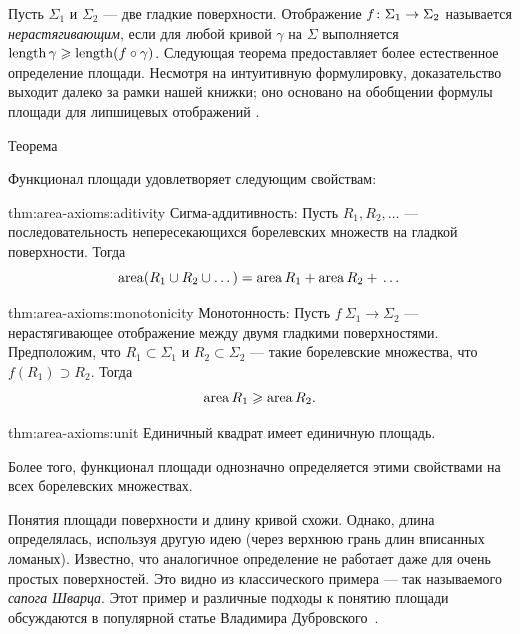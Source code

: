 Пусть $\Sigma_1$ и $\Sigma_2$ --- две гладкие поверхности.
Отображение $f\:\Sigma_1\z\to \Sigma_2$ называется \emph{нерастягивающим}, если для любой кривой $\gamma$ на $\Sigma$ выполняется $\mathop{\rm length}\nolimits\gamma\geqslant \mathop{\rm length}\nolimits (f\circ\gamma)$. 
Следующая теорема предоставляет более естественное определение площади.
Несмотря на интуитивную формулировку, доказательство выходит далеко за рамки нашей книжки;
оно основано на обобщении формулы площади для липшицевых отображений \cite[3.2.3]{federer}.


\begin{thm}{Теорема}\label{thm:area-axioms}
{\sloppy
Функционал площади удовлетворяет следующим свойствам:

}

\begin{subthm}{thm:area-axioms:aditivity}
Сигма-аддитивность: 
Пусть $R_1,R_2,\dots$ --- последовательность непересекающихся борелевских множеств на гладкой поверхности.
Тогда 
\[\mathop{\rm area}\nolimits (R_1\cup R_2\cup \dots)=\mathop{\rm area}\nolimits R_1+\mathop{\rm area}\nolimits R_2+{}\dots\]
\end{subthm}

{\sloppy

\begin{subthm}{thm:area-axioms:monotonicity}
Монотонность:
Пусть $f\:\Sigma_1\to \Sigma_2$ --- нерастягивающее отображение между двумя гладкими поверхностями.
Предположим, что $R_1\subset \Sigma_1$ и $R_2\subset \Sigma_2$ --- такие борелевские множества, что $f(R_1)\supset R_2$.
Тогда 
\[\mathop{\rm area}\nolimits R_1\geqslant \mathop{\rm area}\nolimits R_2.\]
\end{subthm}

}

\begin{subthm}{thm:area-axioms:unit}
Единичный квадрат имеет единичную площадь. 
\end{subthm}

Более того, функционал площади однозначно определяется этими свойствами на всех борелевских множествах.
\end{thm}

Понятия площади поверхности и длину кривой схожи.
Однако, длина определялась, используя другую идею (через верхнюю грань длин вписанных ломаных).
Известно, что аналогичное определение не работает даже для очень простых поверхностей.
Это видно из классического примера --- так называемого \textit{сапога Шварца}.
Этот пример и различные подходы к понятию площади обсуждаются в популярной статье Владимира Дубровского~\cite{dubrovsky}.


